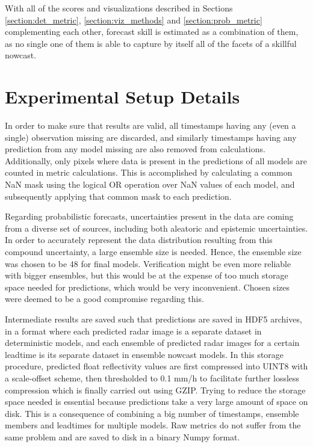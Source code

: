  With all of the scores and visualizations described in Sections \ref{section:det_metric}, \ref{section:viz_methods} and \ref{section:prob_metric} complementing each other, forecast skill is estimated as a combination of them, as no single one of them is able to capture by itself all of the facets of a skillful nowcast. 
 
\section{Experimental Setup Details}
\label{section:exp}

In order to make sure that results are valid, all timestamps having any (even a single) observation missing are discarded, and similarly timestamps having any prediction from any model missing are also removed from calculations. Additionally, only pixels where data is present in the predictions of all models are counted in metric calculations. This is accomplished by calculating a common NaN mask using the logical OR operation over NaN values of each model, and subsequently applying that common mask to each prediction.

Regarding probabilistic forecasts, uncertainties present in the data are coming from a diverse set of sources, including both aleatoric and epistemic uncertainties. In order to accurately represent the data distribution resulting from this compound uncertainty, a large ensemble size is needed. Hence, the ensemble size was chosen to be 48 for final models. Verification might be even more reliable with bigger ensembles, but this would be at the expense of too much storage space needed for predictions, which would be very inconvenient. Chosen sizes were deemed to be a good compromise regarding this.

Intermediate results are saved such that predictions are saved in HDF5 archives, in a format where each predicted radar image is a separate dataset in deterministic models, and each ensemble of predicted radar images for a certain leadtime is its separate dataset in ensemble nowcast models. In this storage procedure, predicted float reflectivity values are first compressed into UINT8 with a scale-offset scheme, then thresholded to 0.1 mm/h to facilitate further lossless compression which is finally carried out using GZIP. Trying to reduce the storage space needed is essential because predictions take a very large amount of space on disk. This is a consequence of combining a big number of timestamps, ensemble members and leadtimes for multiple models. Raw metrics do not suffer from the same problem and are saved to disk in a binary Numpy format.  

